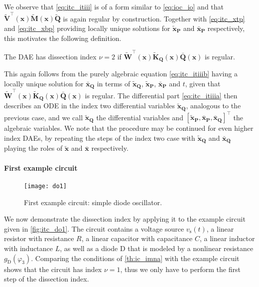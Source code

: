 \documentclass[AMA,STIX1COL]{WileyNJD-v2}
\newcommand{\mb}[1]{\mathbf{#1}}
\newcommand{\mbt}[1]{\tilde{\mathbf{#1}}}
\newcommand{\mbb}[1]{\bar{\mathbf{#1}}}
\newcommand{\mr}[1]{\mathrm{#1}}
\newcommand{\T}{{\!\top}}
\begin{document}
We observe that \eqref{eq:itc_itiii} is of a form similar to \eqref{eq:ioc_io} and that $\mbt{V}^\T (\mb{x}) \mbt{M}(\mb{x}) \mbt{Q}$ is again regular by construction\cite{jansen2014}. Together with \eqref{eq:itc_xtp} and \eqref{eq:itc_xbp} providing locally unique solutions for $\mbt{x}_\mb{P}$ and $\mbb{x}_\mb{P}$ respectively, this motivates the following definition.
\begin{definition}
    \label{def:itc_it}
     The DAE has dissection index $\nu = 2$ if $\mbt{W}^\T (\mb{x}) \mbt{K}_\mb{Q}(\mb{x}) \mbb{Q}(\mb{x})$ is regular.
\end{definition}
This again follows from the purely algebraic equation \eqref{eq:itc_itiiib} having a locally unique solution for $\mbb{x}_\mb{Q}$ in terms of $\mbt{x}_\mb{Q}$, $\mbt{x}_\mb{P}$, $\mbb{x}_\mb{P}$ and $t$, given that $\mbt{W}^\T (\mb{x}) \mbt{K}_\mb{Q}(\mb{x}) \mbb{Q}(\mb{x})$ is regular. The differential part \eqref{eq:itc_itiiia} then describes an ODE in the index two differential variables $\mbt{x}_\mb{Q}$, analogous to the previous case, and we call $\mbt{x}_\mb{Q}$ the differential variables and $[\mbt{x}_\mb{P}, \mbb{x}_\mb{P}, \mbb{x}_\mb{Q}]^\T$ the algebraic variables. We note that the procedure may be continued for even higher index DAEs, by repeating the steps of the index two case with $\mbt{x}_\mb{Q}$ and $\mbb{x}_\mb{Q}$ playing the roles of $\mbt{x}$ and $\mbb{x}$ respectively.

\paragraph{First example circuit}
\begin{figure}[b]
    \begin{center}
        \texttt{[image: do1]}
    \end{center}
    \caption{First example circuit: simple diode oscillator.}
    \label{fig:itc_do1}
\end{figure}
We now demonstrate the dissection index by applying it to the example circuit given in \autoref{fig:itc_do1}. The circuit contains a voltage source $v_\mr{s}(t)$, a linear resistor with resistance $R$, a linear capacitor with capacitance $C$, a linear inductor with inductance $L$, as well as a diode $\mr{D}$ that is modeled by a nonlinear resistance $g_\mr{D}(\varphi_3)$. Comparing the conditions of \autoref{th:ic_imna} with the example circuit shows that the circuit has index $\nu = 1$, thus we only have to perform the first step of the dissection index.
\end{document}
